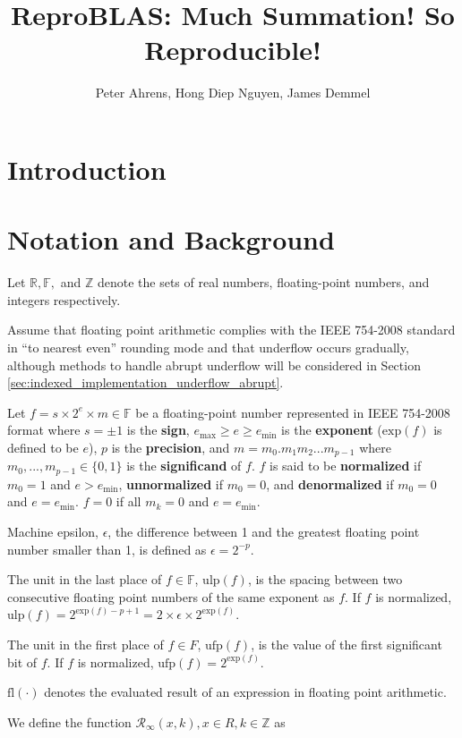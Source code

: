 \documentclass[12pt]{article}
\author{Peter Ahrens, Hong Diep Nguyen, James Demmel}
\title{ReproBLAS: Much Summation! So Reproducible!}
\providecommand{\R}{\ensuremath{\mathbb{R}}}
\providecommand{\F}{\ensuremath{\mathbb{F}}}
\providecommand{\Z}{\ensuremath{\mathbb{Z}}}
\providecommand{\exp}{\ensuremath{\text{exp}}}
\providecommand{\min}{\ensuremath{\text{min}}}
\providecommand{\max}{\ensuremath{\text{max}}}
\providecommand{\ulp}{\ensuremath{\text{ulp}}}
\providecommand{\ufp}{\ensuremath{\text{ufp}}}
\providecommand{\fl}{\ensuremath{\text{fl}}}
\providecommand{\roundtonearestinfty}{\ensuremath{\mathcal{R}_\text{$\infty$}}}
\theoremstyle{plain}
\numberwithin{equation}{section}
\begin{document}
\noindent
\maketitle
\tableofcontents
\newpage
\section{Introduction}
\section{Notation and Background}
  Let $\R, \F, $ and $\Z$ denote the sets of real numbers, floating-point numbers, and integers respectively.

  Assume that floating point arithmetic complies with the IEEE 754-2008 standard \cite{ieee754} in ``to nearest even'' rounding mode and that underflow occurs gradually, although methods to handle abrupt underflow will be considered in Section \ref{sec:indexed_implementation_underflow_abrupt}.

  Let $f = s \times 2^e \times m \in \F$ be a floating-point number represented in IEEE 754-2008 format \cite{ieee754} where $s = \pm 1$ is the \textbf{sign}, $e_{\max} \geq e \geq e_{\min}$ is the \textbf{exponent} ($\exp(f)$ is defined to be $e$), $p$ is the \textbf{precision}, and $m = m_0.m_1m_2...m_{p-1}$ where $m_0, ..., m_{p - 1} \in \{0, 1\}$ is the \textbf{significand} of $f$. $f$ is said to be \textbf{normalized} if $m_0 = 1$ and $e > e_{\min}$, \textbf{unnormalized} if $m_0 = 0$, and \textbf{denormalized} if $m_0 = 0$ and $e = e_{\min}$. $f = 0$ if all $m_k = 0$ and $e = e_{\min}$.

  Machine epsilon, $\epsilon$, the difference between 1 and the greatest floating point number smaller than 1, is defined as $\epsilon = 2^{-p}$.

  The unit in the last place of $f \in \F$, $\ulp(f)$, is the spacing between two consecutive floating point numbers of the same exponent as $f$. If $f$ is normalized, $\ulp(f) = 2^{\exp(f) - p + 1} = 2 \times \epsilon \times 2^{\exp(f)}$.

  The unit in the first place of $f \in F$, $\ufp(f)$, is the value of the first significant bit of $f$. If $f$ is normalized, $\ufp(f) = 2^{\exp(f)}$.

  $\fl(\cdot)$ denotes the evaluated result of an expression in floating point arithmetic.

  We define the function $\roundtonearestinfty(x, k), x \in R, k \in \Z$ as
\end{document}
